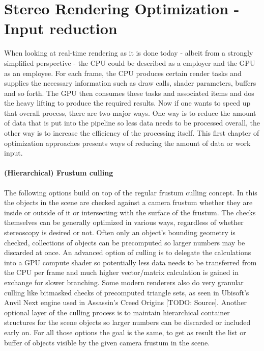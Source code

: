 
\chapter{Stereo Rendering Optimization - Input reduction}
When looking at real-time rendering as it is done today - albeit from a strongly simplified perspective - the CPU could be described as a employer and the GPU as an employee. For each frame, the CPU produces certain render tasks and supplies the necessary information such as draw calls, shader parameters, buffers and so forth. The GPU then consumes these tasks and associated items and dos the heavy lifting to produce the required results. 
Now if one wants to speed up that overall process, there are two major ways. One way is to reduce the amount of data that is put into the pipeline so less data needs to be processed overall, the other way is to increase the efficiency of the processing itself.  
This first chapter of optimization approaches presents ways of reducing the amount of data or work input. 

\subsubsection{(Hierarchical) Frustum culling}
The following options build on top of the regular frustum culling concept. In this the objects in the scene are checked against a camera frustum whether they are inside or outside of it or intersecting with the surface of the frustum. The checks themselves can be generally optimized in various ways, regardless of whether stereoscopy is desired or not. Often only an object's bounding geometry is checked, collections of objects can be precomputed so larger numbers may be discarded at once. An advanced option of culling is to delegate the calculations into a GPU compute shader so potentially less data needs to be transferred from the CPU per frame and much higher vector/matrix calculation is gained in exchange for slower branching. Some modern renderers also do very granular culling like bitmasked checks of precomputed triangle sets, as seen in Ubisoft's Anvil Next engine used in Assassin's Creed Origins [TODO: Source]. 
Another optional layer of the culling process is to maintain hierarchical container structures for the scene objects so larger numbers can be discarded or included early on. 
For all those options the goal is the same, to get as result the list or buffer of objects visible by the given camera frustum in the scene. 

